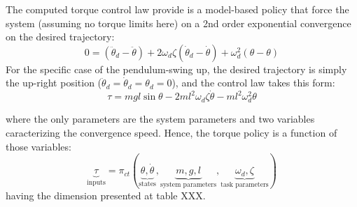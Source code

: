 The computed torque control law provide is a model-based policy that force the system (assuming no torque limits here) on a 2nd order exponential convergence on the desired trajectory:
\begin{equation}
0 = (\ddot{\theta}_d - \ddot{\theta})+ 2 \omega_d \zeta (\dot{\theta}_d - \dot{\theta}) + \omega_d^2 (\theta - \theta)
\end{equation}
For the specific case of the pendulum-swing up, the desired trajectory is simply the up-right position ($\ddot{\theta}_d = \dot{\theta}_d = \theta_d = 0$), and the control law takes this form:
\begin{equation}
\tau = mgl \sin \theta - 2 m l^2 \omega_d \zeta \dot{\theta} - m l^2 \omega_d^2 \theta
\label{eq:ct}
\end{equation}

where the only parameters are the system parameters and two variables caracterizing the convergence speed. Hence, the torque policy is a function of those variables:
\begin{equation}
\underbrace{\tau}_{\text{inputs}}
=
\pi_{ct} \left(
\underbrace{ \theta, \dot{\theta} }_{\text{states}},
\underbrace{ m , g , l }_{\text{system parameters}},
\underbrace{ \omega_d , \zeta }_{\text{task parameters}}
\right)
\end{equation}
having the dimension presented at table XXX.

